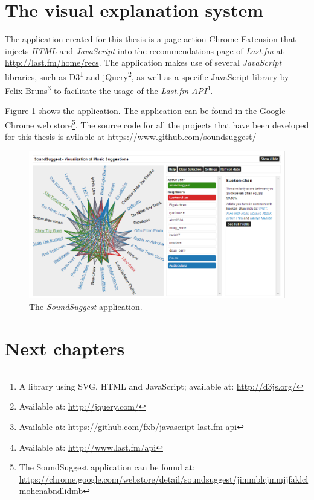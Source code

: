 \section{The visual explanation system}\label{chapter:introduction:section:application}

The application created for this thesis is a page action Chrome Extension that injects \emph{HTML} and \emph{JavaScript} into the recommendations page of \emph{Last.fm} at \url{http://last.fm/home/recs}. The application makes use of several \emph{JavaScript} libraries, such as D3\footnote{A library using SVG, HTML and JavaScript\cite{bostock:2012:d3js}; available at: \url{http://d3js.org/}} and jQuery\footnote{Available at: \url{http://jquery.com/}}, as well as a specific JavaScript library by Felix Bruns\footnote{Available at: \url{https://github.com/fxb/javascript-last.fm-api}} to facilitate the usage of the \emph{Last.fm API}\footnote{Available at: \url{http://www.last.fm/api}}.

Figure \ref{figure:soundsuggest} shows the application. The application can be found in the Google Chrome web store\footnote{The SoundSuggest application can be found at: \url{https://chrome.google.com/webstore/detail/soundsuggest/jimmblcjmmjjfaklclmohcnabndlidmb}}. The source code for all the projects that have been developed for this thesis is avilable at \url{https://www.github.com/soundsuggest/}

\begin{figure}
	\begin{center}
		\includegraphics[width=\columnwidth]{img/soundsuggest}%
	\end{center}
	\caption{The \emph{SoundSuggest} application.}
	\label{figure:soundsuggest}
\end{figure}


\section{Next chapters}\label{chapter:introduction:section:chapters}

